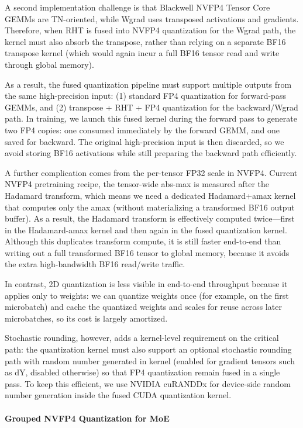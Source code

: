 \documentclass[10pt,logo,copyright]{nvidiatechreport}
\begin{document}
A second implementation challenge is that Blackwell NVFP4 Tensor Core GEMMs are TN-oriented, while Wgrad uses transposed activations and gradients. Therefore, when RHT is fused into NVFP4 quantization for the Wgrad path, the kernel must also absorb the transpose, rather than relying on a separate BF16 transpose kernel (which would again incur a full BF16 tensor read and write through global memory).

As a result, the fused quantization pipeline must support multiple outputs from the same high-precision input: (1) standard FP4 quantization for forward-pass GEMMs, and (2) transpose + RHT + FP4 quantization for the backward/Wgrad path. In training, we launch this fused kernel during the forward pass to generate two FP4 copies: one consumed immediately by the forward GEMM, and one saved for backward. The original high-precision input is then discarded, so we avoid storing BF16 activations while still preparing the backward path efficiently.

A further complication comes from the per-tensor FP32 scale in NVFP4. Current NVFP4 pretraining recipe, the tensor-wide abs-max is measured after the Hadamard transform, which means we need a dedicated Hadamard+amax kernel that computes only the amax (without materializing a transformed BF16 output buffer). As a result, the Hadamard transform is effectively computed twice—first in the Hadamard-amax kernel and then again in the fused quantization kernel. Although this duplicates transform compute, it is still faster end-to-end than writing out a full transformed BF16 tensor to global memory, because it avoids the extra high-bandwidth BF16 read/write traffic.

In contrast, 2D quantization is less visible in end-to-end throughput because it applies only to weights: we can quantize weights once (for example, on the first microbatch) and cache the quantized weights and scales for reuse across later microbatches, so its cost is largely amortized. 

Stochastic rounding, however, adds a kernel-level requirement on the critical path: the quantization kernel must also support an optional stochastic rounding path with random number generated in kernel (enabled for gradient tensors such as dY, disabled otherwise) so that FP4 quantization remain fused in a single pass. To keep this efficient, we use NVIDIA cuRANDDx\cite{curanddx} for device-side random number generation inside the fused CUDA quantization kernel.

\paragraph{Grouped NVFP4 Quantization for MoE}
\end{document}
